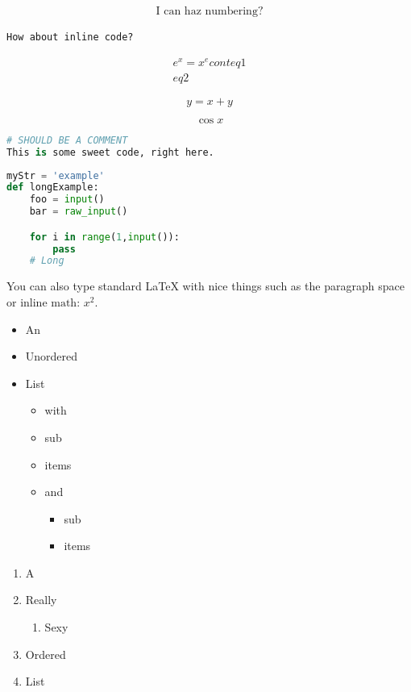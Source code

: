 \documentclass{article}
\begin{document}
\begin{gather}
\textrm{I can haz numbering?}
\end{gather}

\lstinline[columns=fixed]{How about inline code?}

\begin{gather*}
e^x = x^e cont eq 1\\
eq 2
\end{gather*}

$$ y = x + y $$

$$ \cos x $$

\begin{lstlisting}[language=python,]
# SHOULD BE A COMMENT
This is some sweet code, right here.
\end{lstlisting}

\begin{lstlisting}[language=python,caption=This is code with a caption.]
myStr = 'example'
def longExample:
    foo = input()
    bar = raw_input()

    for i in range(1,input()):
        pass
    # Long
\end{lstlisting}

\noindent\makebox[\linewidth]{\rule{\textwidth}{0.4pt}}

You can also type standard \LaTeX{} with nice things
such as the paragraph space or $\textrm{inline math: }x^2$.

\begin{itemize}
\item An
\item Unordered
\item List
\begin{itemize}
\item with
\item sub
\item items
\item and
\begin{itemize}
\item sub
\item items
\end{itemize}
\end{itemize}
\end{itemize}
\begin{enumerate}
\item A
\item Really
\begin{enumerate}
\item Sexy
\end{enumerate}
\item Ordered
\item List
\end{enumerate}
\end{document}
